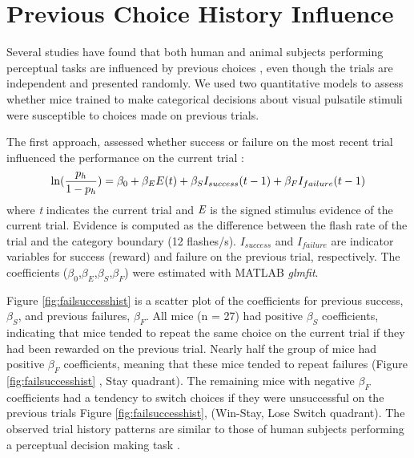 \section{Previous Choice History Influence}
Several studies have found that both human and animal subjects performing perceptual tasks are influenced by previous choices \parencite{Busse2011,Frund2014,Scott2015SourcesRats,Abrahamyan2016,Urai2017}, even though the trials are independent and presented randomly. We used two quantitative models to assess whether mice trained to make categorical decisions about visual pulsatile stimuli were susceptible to choices made on previous trials.\par 
The first approach, assessed whether success or failure on the most recent trial influenced the performance on the current trial \parencite{Busse2011}: 
\begin{equation}
	\centering
	\ln(\frac{p_h}{1-p_h}) = \beta_0 + \beta_E E(t) + \beta_S I_{success} (t-1) + \beta_F I_{failure} (t-1)
    \label{eq:BusseChoice}
\end{equation}
where \emph{t} indicates the current trial and $\emph{E}$ is the signed stimulus evidence of the current trial. Evidence is computed as the difference between the flash rate of the trial and the category boundary (12 flashes/s). \emph{$I_{success}$} and \emph{$I_{failure}$} are indicator variables for success (reward) and failure on the previous trial, respectively. The coefficients ($\beta_0$,$\beta_E$,$\beta_S$,$\beta_F$) were estimated with MATLAB \emph{glmfit}.\par 
Figure \ref{fig:failsuccesshist} is a scatter plot of the coefficients for previous success, $\beta_S$, and previous failures, $\beta_F$. All mice (n = 27) had positive $\beta_S$ coefficients, indicating that mice tended to repeat the same choice on the current trial if they had been rewarded on the previous trial. Nearly half the group of mice had positive $\beta_F$ coefficients, meaning that these mice tended to repeat failures (Figure \ref{fig:failsuccesshist} , Stay quadrant). The remaining mice with negative $\beta_F$ coefficients had a tendency to switch choices if they were unsuccessful on the previous trials Figure \ref{fig:failsuccesshist}, (Win-Stay, Lose Switch quadrant). The observed trial history patterns are similar to those of human subjects performing a perceptual decision making task \parencite{Abrahamyan2016}. \par 
